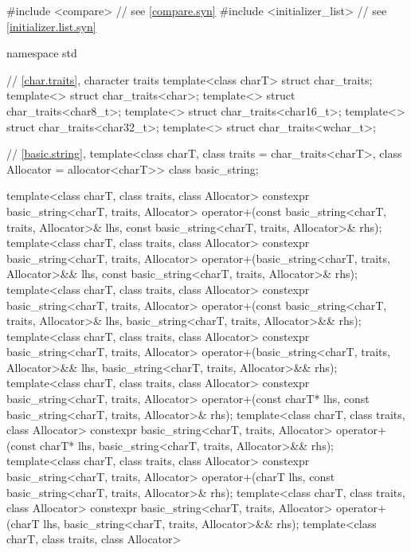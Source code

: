 \begin{codeblock}
#include <compare>              // see \ref{compare.syn}
#include <initializer_list>     // see \ref{initializer.list.syn}

namespace std {
  // \ref{char.traits}, character traits
  template<class charT> struct char_traits;
  template<> struct char_traits<char>;
  template<> struct char_traits<char8_t>;
  template<> struct char_traits<char16_t>;
  template<> struct char_traits<char32_t>;
  template<> struct char_traits<wchar_t>;

  // \ref{basic.string}, 
  template<class charT, class traits = char_traits<charT>, class Allocator = allocator<charT>>
    class basic_string;

  template<class charT, class traits, class Allocator>
    constexpr basic_string<charT, traits, Allocator>
      operator+(const basic_string<charT, traits, Allocator>& lhs,
                const basic_string<charT, traits, Allocator>& rhs);
  template<class charT, class traits, class Allocator>
    constexpr basic_string<charT, traits, Allocator>
      operator+(basic_string<charT, traits, Allocator>&& lhs,
                const basic_string<charT, traits, Allocator>& rhs);
  template<class charT, class traits, class Allocator>
    constexpr basic_string<charT, traits, Allocator>
      operator+(const basic_string<charT, traits, Allocator>& lhs,
                basic_string<charT, traits, Allocator>&& rhs);
  template<class charT, class traits, class Allocator>
    constexpr basic_string<charT, traits, Allocator>
      operator+(basic_string<charT, traits, Allocator>&& lhs,
                basic_string<charT, traits, Allocator>&& rhs);
  template<class charT, class traits, class Allocator>
    constexpr basic_string<charT, traits, Allocator>
      operator+(const charT* lhs,
                const basic_string<charT, traits, Allocator>& rhs);
  template<class charT, class traits, class Allocator>
    constexpr basic_string<charT, traits, Allocator>
      operator+(const charT* lhs,
                basic_string<charT, traits, Allocator>&& rhs);
  template<class charT, class traits, class Allocator>
    constexpr basic_string<charT, traits, Allocator>
      operator+(charT lhs,
                const basic_string<charT, traits, Allocator>& rhs);
  template<class charT, class traits, class Allocator>
    constexpr basic_string<charT, traits, Allocator>
      operator+(charT lhs,
                basic_string<charT, traits, Allocator>&& rhs);
  template<class charT, class traits, class Allocator>
}
\end{codeblock}
